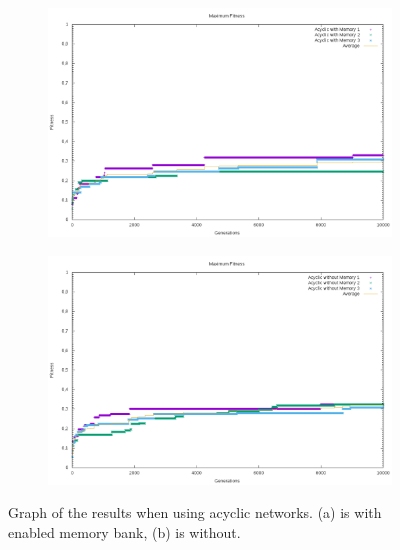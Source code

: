 \begin{figure}[ht]
	\begin{subfigure}{\textwidth}
		\includegraphics[width=\textwidth]{figures/acyclicmemory.png}
		\caption{}
	\end{subfigure}
	\begin{subfigure}{\textwidth}
		\includegraphics[width=\textwidth]{figures/acyclicnomemory.png}
		\caption{}
	\end{subfigure}
	\caption{Graph of the results when using acyclic networks. (a) is with enabled memory bank, (b) is without.}
	\label{experiments:graph:2}
\end{figure}

